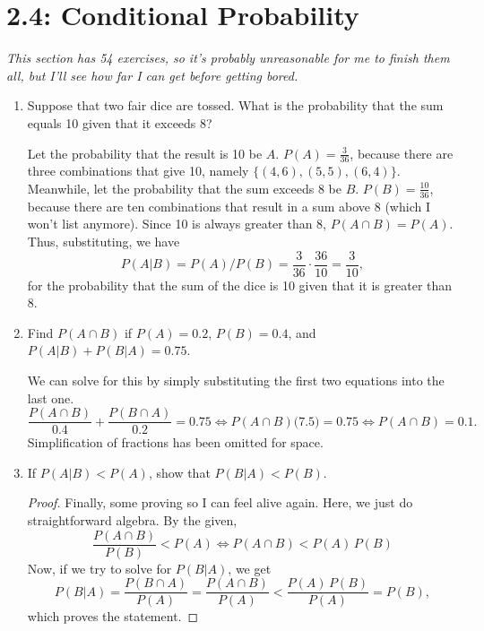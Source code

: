 \documentclass{article}
\begin{document}
\section*{2.4: Conditional Probability}
\textit{This section has 54 exercises, so it's probably unreasonable for me to finish them all, but I'll see how far I can get before getting bored. }
\begin{enumerate}
    \item Suppose that two fair dice are tossed. What is the probability that the sum equals 10 given that it exceeds 8?\begin{solution}
        Let the probability that the result is 10 be \(A\). \(P(A) = \frac{3}{36}\), because there are three combinations that give 10, namely \(\lbrace(4,6),(5,5),(6,4)\rbrace\). Meanwhile, let the probability 
        that the sum  exceeds 8 be \(B\). \(P(B) = \frac{10}{36}\), because there are ten combinations that result in a sum above 8 (which I won't list anymore). Since 10 is always greater than 8, 
        \(P(A\cap{}B) = P(A)\). Thus, substituting, we have\[
            P(A|B) = P(A) / P(B) = \frac{3}{36} \cdot \frac{36}{10} = \frac{3}{10},
        \] for the probability that the sum of the dice is 10 given that it is greater than 8. 
    \end{solution}
    \item Find \(P(A\cap{}B)\) if \(P(A) = 0.2\), \(P(B) = 0.4\), and \(P(A|B) + P(B|A) =0.75\).\begin{solution}
        We can solve for this by simply substituting the first two equations into the last one.\[
            \frac{P(A\cap{}B)}{0.4} + \frac{P(B\cap{}A)}{0.2} =0.75 \Longleftrightarrow P(A\cap{}B) \big(7.5\big) = 0.75 \Longleftrightarrow P(A\cap{}B) = 0.1. 
        \] Simplification of fractions has been omitted for space. 
    \end{solution}
    \item If \(P(A|B) < P(A)\), show that \(P(B|A) < P(B)\).\begin{proof}
        Finally, some proving so I can feel alive again. Here, we just do straightforward algebra. By the given,\[
            \frac{P(A\cap{}B)}{P(B)} < P(A) \Longleftrightarrow
            P(A\cap{}B) < P(A)\,P(B)
        \] Now, if we try to solve for \(P(B|A)\), we get\[
            P(B|A) = \frac{P(B\cap{}A)}{P(A)} = \frac{P(A\cap{}B)}{P(A)}< \frac{P(A)\,P(B)}{P(A)} = P(B),
        \] which proves the statement. 
    \end{proof}
\end{enumerate}
\end{document}

